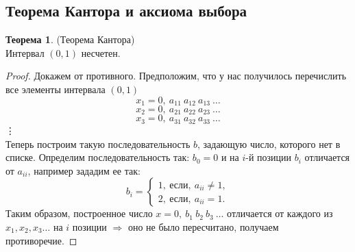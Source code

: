 \documentclass[a4paper, 12pt]{article}
\newcommand\tab[1][.5cm]{\hspace*{#1}}
\theoremstyle{definition}
\newtheorem*{theorem}{Теорема}
\begin{document}
        \subsection{Теорема Кантора и аксиома выбора}
        \begin{theorem} (Теорема Кантора)\\
            Интервал $(0,1)$ несчетен.
        \end{theorem}
        \begin{proof}
            Докажем от противного. Предположим, что у нас получилось перечислить все элементы интервала $(0,1)$ 
            \[x_1=0,\ a_{11}\ a_{12}\ a_{13}\ \dots\]
            \[x_2=0,\ a_{21}\ a_{22}\ a_{23}\ \dots\]
            \[x_3=0,\ a_{31}\ a_{32}\ a_{33}\ \dots\]
            \tab[6.35cm] \vdots \\
            Теперь построим такую последовательность $b$, задающую число, которого нет в списке. Определим последовательность так: $b_0 = 0$ и на $i$-й позиции $b_i$ отличается от $a_{ii}$, например зададим ее так:
            \[b_i=
            \begin{cases}
                1,\ \text{если},\ a_{ii}\ne 1,\\
                2,\ \text{если},\ a_{ii}=1.
            \end{cases}\]
            Таким образом, построенное число $x = 0,\ b_1\ b_2\ b_3\ \dots$ отличается от каждого из $x_1,x_2,x_3\dots$ на $i$ позиции $\Rightarrow$ оно не было пересчитано, получаем противоречие.
        \end{proof} 
\end{document}
